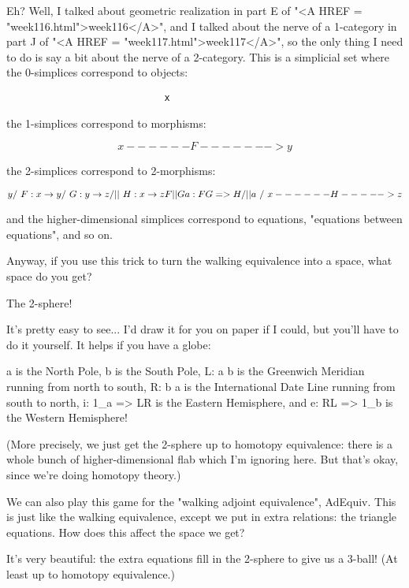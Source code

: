 Eh?  Well, I talked about geometric realization in part E of "<A
HREF = "week116.html">week116</A>", and I talked about the nerve of
a 1-category in part J of "<A HREF =
"week117.html">week117</A>", so the only thing I need to do is say
a bit about the nerve of a 2-category.  This is a simplicial set where
the 0-simplices correspond to objects:


\begin{verbatim}
                            x
\end{verbatim}
    
the 1-simplices correspond to morphisms:


$$
                    x ------F-------> y
$$
    
the 2-simplices correspond to 2-morphisms:

$$
                            y
                           / \                F: x \to  y 
                          /   \               G: y \to  z
                         / ||  \              H: x \to  z
                        F  ||   G             a: FG => H
                       /   ||a   \
                      /    \/     \
                     x------H----->z
$$
    
and the higher-dimensional simplices correspond to equations, "equations
between equations", and so on.  

Anyway, if you use this trick to turn the walking equivalence into
a space, what space do you get?  

The 2-sphere!  

It's pretty easy to see... I'd draw it for you on paper if I could, but
you'll have to do it yourself.  It helps if you have a globe:

a is the North Pole, 
b is the South Pole, 
L: a \to  b is the Greenwich Meridian running from north to south, 
R: b \to  a is the International Date Line running from south to north, 
i: 1_{a} => LR is the Eastern Hemisphere, and 
e: RL => 1_{b} is the Western Hemisphere!

(More precisely, we just get the 2-sphere up to homotopy equivalence:
there is a whole bunch of higher-dimensional flab which I'm ignoring
here.  But that's okay, since we're doing homotopy theory.)

We can also play this game for the "walking adjoint equivalence",
AdEquiv.  This is just like the walking equivalence, except we put in
extra relations: the triangle equations.  How does this affect the space
we get?

It's very beautiful: the extra equations fill in the 2-sphere to give us
a 3-ball!  (At least up to homotopy equivalence.)



